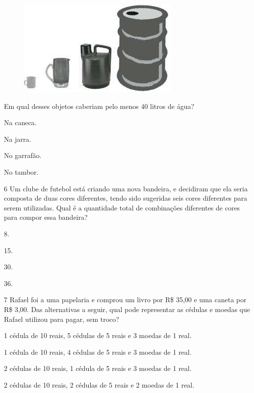 \begin{figure}[htpb!]
\centering
\includegraphics[width=.7\textwidth]{media/image87.jpg}
\end{figure}

Em qual desses objetos caberiam pelo menos 40 litros de água?

\begin{escolha}
\item
  Na caneca.
\item
  Na jarra.
\item
  No garrafão.
\item
  No tambor.
\end{escolha}


\num{6} Um clube de futebol está criando uma nova bandeira, e decidiram que ela seria composta de duas cores diferentes, tendo sido sugeridas seis cores
diferentes para serem utilizadas. Qual é a quantidade total de combinações
diferentes de cores para compor essa bandeira?

\begin{escolha}
\item
  8.
\item
  15.
\item
  30.
\item
  36.
\end{escolha}


\num{7} Rafael foi a uma papelaria e comprou um livro por R\$ 35,00 e uma caneta
por R\$ 3,00. Das alternativas a seguir, qual pode representar as cédulas
e moedas que Rafael utilizou para pagar, sem troco?

\begin{escolha}
\item
  1 cédula de 10 reais, 5 cédulas de 5 reais e 3 moedas de 1 real.
\item
  1 cédula de 10 reais, 4 cédulas de 5 reais e 3 moedas de 1 real.
\item
  2 cédulas de 10 reais, 1 cédula de 5 reais e 3 moedas de 1 real.
\item
  2 cédulas de 10 reais, 2 cédulas de 5 reais e 2 moedas de 1 real.
\end{escolha}


